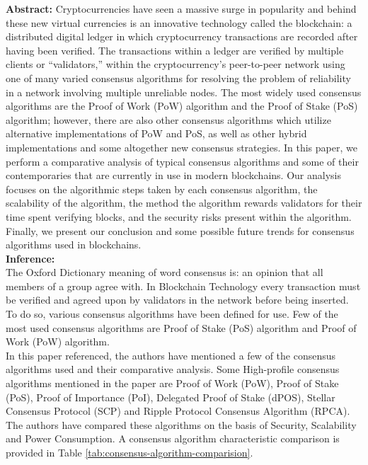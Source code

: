 \documentclass[oneside, 12pt]{book}
\begin{document}
\begin{enumerate}
					\textbf{Abstract:} Cryptocurrencies have seen a massive surge in popularity and behind these new virtual currencies is an innovative technology called the blockchain: a distributed digital ledger in which cryptocurrency transactions are recorded after having been verified. The transactions within a ledger are verified by multiple clients or “validators,” within the cryptocurrency's peer-to-peer network using one of many varied consensus algorithms for resolving the problem of reliability in a network involving multiple unreliable nodes. The most widely used consensus algorithms are the Proof of Work (PoW) algorithm and the Proof of Stake (PoS) algorithm; however, there are also other consensus algorithms which utilize alternative implementations of PoW and PoS, as well as other hybrid implementations and some altogether new consensus strategies. In this paper, we perform a comparative analysis of typical consensus algorithms and some of their contemporaries that are currently in use in modern blockchains. Our analysis focuses on the algorithmic steps taken by each consensus algorithm, the scalability of the algorithm, the method the algorithm rewards validators for their time spent verifying blocks, and the security risks present within the algorithm. Finally, we present our conclusion and some possible future trends for consensus algorithms used in blockchains.\\
					\textbf{Inference:}
					\\The Oxford Dictionary meaning of word consensus is: an opinion that all members of a group agree with. In Blockchain Technology every transaction must be verified and agreed upon by validators in the network before being inserted. To do so, various consensus algorithms have been defined for use. Few of the most used consensus algorithms are Proof of Stake (PoS) algorithm and Proof of Work (PoW) algorithm.
					\\In this paper referenced, the authors have mentioned a few of the consensus algorithms used and their comparative analysis. Some High-profile consensus algorithms mentioned in the paper are Proof of Work (PoW), Proof of Stake (PoS), Proof of Importance (PoI), Delegated Proof of Stake (dPOS), Stellar Consensus Protocol (SCP) and Ripple Protocol Consensus Algorithm (RPCA). The authors have compared these algorithms on the basis of Security, Scalability and Power Consumption. A consensus algorithm characteristic comparison is provided in Table \ref{tab:consensus-algorithm-comparision}.
					\begin{table}[H]

\end{table}
\end{enumerate}
\end{document}
